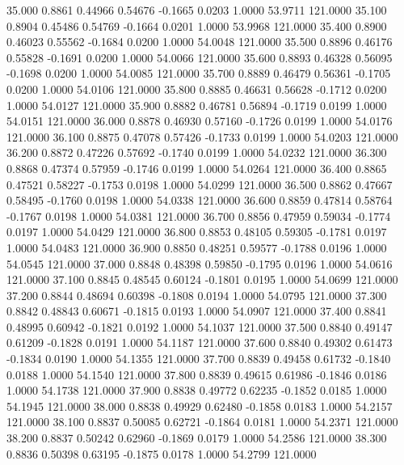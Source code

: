   35.000   0.8861   0.44966   0.54676  -0.1665   0.0203   1.0000  53.9711 121.0000
  35.100   0.8904   0.45486   0.54769  -0.1664   0.0201   1.0000  53.9968 121.0000
  35.400   0.8900   0.46023   0.55562  -0.1684   0.0200   1.0000  54.0048 121.0000
  35.500   0.8896   0.46176   0.55828  -0.1691   0.0200   1.0000  54.0066 121.0000
  35.600   0.8893   0.46328   0.56095  -0.1698   0.0200   1.0000  54.0085 121.0000
  35.700   0.8889   0.46479   0.56361  -0.1705   0.0200   1.0000  54.0106 121.0000
  35.800   0.8885   0.46631   0.56628  -0.1712   0.0200   1.0000  54.0127 121.0000
  35.900   0.8882   0.46781   0.56894  -0.1719   0.0199   1.0000  54.0151 121.0000
  36.000   0.8878   0.46930   0.57160  -0.1726   0.0199   1.0000  54.0176 121.0000
  36.100   0.8875   0.47078   0.57426  -0.1733   0.0199   1.0000  54.0203 121.0000
  36.200   0.8872   0.47226   0.57692  -0.1740   0.0199   1.0000  54.0232 121.0000
  36.300   0.8868   0.47374   0.57959  -0.1746   0.0199   1.0000  54.0264 121.0000
  36.400   0.8865   0.47521   0.58227  -0.1753   0.0198   1.0000  54.0299 121.0000
  36.500   0.8862   0.47667   0.58495  -0.1760   0.0198   1.0000  54.0338 121.0000
  36.600   0.8859   0.47814   0.58764  -0.1767   0.0198   1.0000  54.0381 121.0000
  36.700   0.8856   0.47959   0.59034  -0.1774   0.0197   1.0000  54.0429 121.0000
  36.800   0.8853   0.48105   0.59305  -0.1781   0.0197   1.0000  54.0483 121.0000
  36.900   0.8850   0.48251   0.59577  -0.1788   0.0196   1.0000  54.0545 121.0000
  37.000   0.8848   0.48398   0.59850  -0.1795   0.0196   1.0000  54.0616 121.0000
  37.100   0.8845   0.48545   0.60124  -0.1801   0.0195   1.0000  54.0699 121.0000
  37.200   0.8844   0.48694   0.60398  -0.1808   0.0194   1.0000  54.0795 121.0000
  37.300   0.8842   0.48843   0.60671  -0.1815   0.0193   1.0000  54.0907 121.0000
  37.400   0.8841   0.48995   0.60942  -0.1821   0.0192   1.0000  54.1037 121.0000
  37.500   0.8840   0.49147   0.61209  -0.1828   0.0191   1.0000  54.1187 121.0000
  37.600   0.8840   0.49302   0.61473  -0.1834   0.0190   1.0000  54.1355 121.0000
  37.700   0.8839   0.49458   0.61732  -0.1840   0.0188   1.0000  54.1540 121.0000
  37.800   0.8839   0.49615   0.61986  -0.1846   0.0186   1.0000  54.1738 121.0000
  37.900   0.8838   0.49772   0.62235  -0.1852   0.0185   1.0000  54.1945 121.0000
  38.000   0.8838   0.49929   0.62480  -0.1858   0.0183   1.0000  54.2157 121.0000
  38.100   0.8837   0.50085   0.62721  -0.1864   0.0181   1.0000  54.2371 121.0000
  38.200   0.8837   0.50242   0.62960  -0.1869   0.0179   1.0000  54.2586 121.0000
  38.300   0.8836   0.50398   0.63195  -0.1875   0.0178   1.0000  54.2799 121.0000
